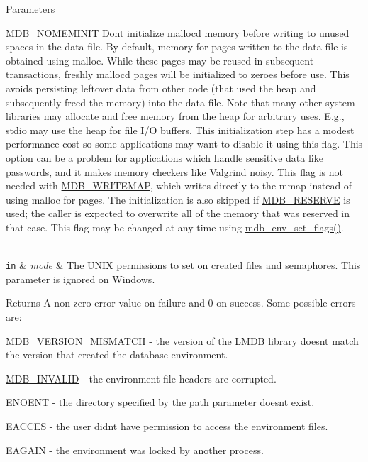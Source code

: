\begin{DoxyParams}[1]{Parameters}
\begin{DoxyItemize}
\item \mbox{\hyperlink{group__mdb__env_gafa035a1f17ebf31376eafb7bd2cdd448}{M\+D\+B\+\_\+\+N\+O\+M\+E\+M\+I\+N\+IT}} Don\textquotesingle{}t initialize malloc\textquotesingle{}d memory before writing to unused spaces in the data file. By default, memory for pages written to the data file is obtained using malloc. While these pages may be reused in subsequent transactions, freshly malloc\textquotesingle{}d pages will be initialized to zeroes before use. This avoids persisting leftover data from other code (that used the heap and subsequently freed the memory) into the data file. Note that many other system libraries may allocate and free memory from the heap for arbitrary uses. E.\+g., stdio may use the heap for file I/O buffers. This initialization step has a modest performance cost so some applications may want to disable it using this flag. This option can be a problem for applications which handle sensitive data like passwords, and it makes memory checkers like Valgrind noisy. This flag is not needed with \mbox{\hyperlink{group__mdb__env_ga7b81e9fd5f8fae38786d67e1a8387fa7}{M\+D\+B\+\_\+\+W\+R\+I\+T\+E\+M\+AP}}, which writes directly to the mmap instead of using malloc for pages. The initialization is also skipped if \mbox{\hyperlink{group__mdb__put_gac0545c6aea719991e3eae6ccc686efcc}{M\+D\+B\+\_\+\+R\+E\+S\+E\+R\+VE}} is used; the caller is expected to overwrite all of the memory that was reserved in that case. This flag may be changed at any time using \mbox{\hyperlink{group__mdb_ga83f66cf02bfd42119451e9468dc58445}{mdb\+\_\+env\+\_\+set\+\_\+flags()}}. 
\end{DoxyItemize}\\
\hline
\mbox{\tt in}  & {\em mode} & The U\+N\+IX permissions to set on created files and semaphores. This parameter is ignored on Windows. \\
\hline
\end{DoxyParams}
\begin{DoxyReturn}{Returns}
A non-\/zero error value on failure and 0 on success. Some possible errors are\+: 
\begin{DoxyItemize}
\item \mbox{\hyperlink{group__errors_ga909b2db047fa90fb0d37a78f86a6f99b}{M\+D\+B\+\_\+\+V\+E\+R\+S\+I\+O\+N\+\_\+\+M\+I\+S\+M\+A\+T\+CH}} -\/ the version of the L\+M\+DB library doesn\textquotesingle{}t match the version that created the database environment. 
\item \mbox{\hyperlink{group__errors_ga9c2257e8cd8ea027cb682588b235a6f0}{M\+D\+B\+\_\+\+I\+N\+V\+A\+L\+ID}} -\/ the environment file headers are corrupted. 
\item E\+N\+O\+E\+NT -\/ the directory specified by the path parameter doesn\textquotesingle{}t exist. 
\item E\+A\+C\+C\+ES -\/ the user didn\textquotesingle{}t have permission to access the environment files. 
\item E\+A\+G\+A\+IN -\/ the environment was locked by another process. 
\end{DoxyItemize}
\end{DoxyReturn}


